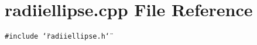 \section{radiiellipse.cpp File Reference}
\label{radiiellipse_8cpp}
{\tt \#include \char`\"{}radiiellipse.h\char`\"{}}\par
